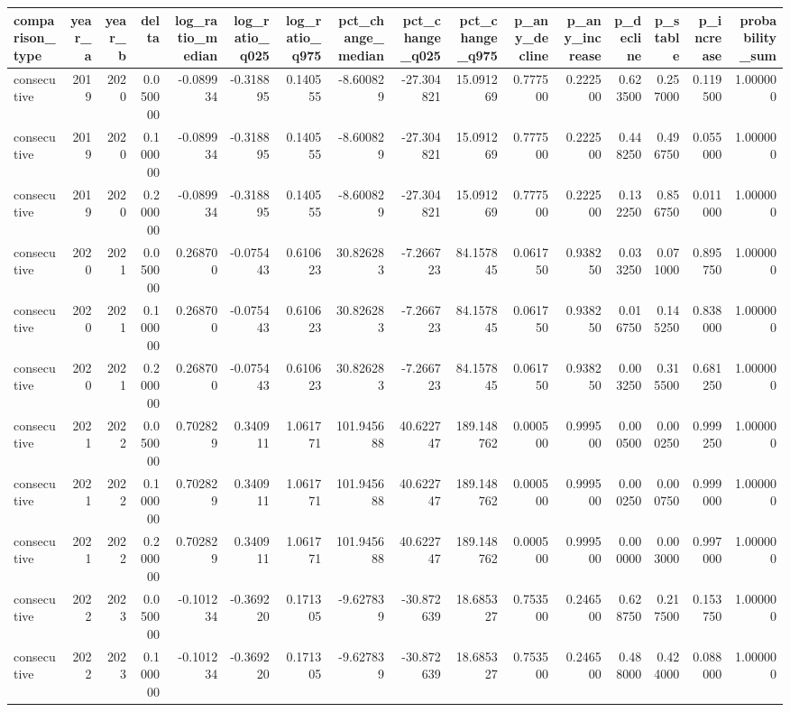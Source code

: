 \begin{tabular}{lrrrrrrrrrrrrrrr}
\toprule
comparison\_type & year\_a & year\_b & delta & log\_ratio\_median & log\_ratio\_q025 & log\_ratio\_q975 & pct\_change\_median & pct\_change\_q025 & pct\_change\_q975 & p\_any\_decline & p\_any\_increase & p\_decline & p\_stable & p\_increase & probability\_sum \\
\midrule
consecutive & 2019 & 2020 & 0.050000 & -0.089934 & -0.318895 & 0.140555 & -8.600829 & -27.304821 & 15.091269 & 0.777500 & 0.222500 & 0.623500 & 0.257000 & 0.119500 & 1.000000 \\
consecutive & 2019 & 2020 & 0.100000 & -0.089934 & -0.318895 & 0.140555 & -8.600829 & -27.304821 & 15.091269 & 0.777500 & 0.222500 & 0.448250 & 0.496750 & 0.055000 & 1.000000 \\
consecutive & 2019 & 2020 & 0.200000 & -0.089934 & -0.318895 & 0.140555 & -8.600829 & -27.304821 & 15.091269 & 0.777500 & 0.222500 & 0.132250 & 0.856750 & 0.011000 & 1.000000 \\
consecutive & 2020 & 2021 & 0.050000 & 0.268700 & -0.075443 & 0.610623 & 30.826283 & -7.266723 & 84.157845 & 0.061750 & 0.938250 & 0.033250 & 0.071000 & 0.895750 & 1.000000 \\
consecutive & 2020 & 2021 & 0.100000 & 0.268700 & -0.075443 & 0.610623 & 30.826283 & -7.266723 & 84.157845 & 0.061750 & 0.938250 & 0.016750 & 0.145250 & 0.838000 & 1.000000 \\
consecutive & 2020 & 2021 & 0.200000 & 0.268700 & -0.075443 & 0.610623 & 30.826283 & -7.266723 & 84.157845 & 0.061750 & 0.938250 & 0.003250 & 0.315500 & 0.681250 & 1.000000 \\
consecutive & 2021 & 2022 & 0.050000 & 0.702829 & 0.340911 & 1.061771 & 101.945688 & 40.622747 & 189.148762 & 0.000500 & 0.999500 & 0.000500 & 0.000250 & 0.999250 & 1.000000 \\
consecutive & 2021 & 2022 & 0.100000 & 0.702829 & 0.340911 & 1.061771 & 101.945688 & 40.622747 & 189.148762 & 0.000500 & 0.999500 & 0.000250 & 0.000750 & 0.999000 & 1.000000 \\
consecutive & 2021 & 2022 & 0.200000 & 0.702829 & 0.340911 & 1.061771 & 101.945688 & 40.622747 & 189.148762 & 0.000500 & 0.999500 & 0.000000 & 0.003000 & 0.997000 & 1.000000 \\
consecutive & 2022 & 2023 & 0.050000 & -0.101234 & -0.369220 & 0.171305 & -9.627839 & -30.872639 & 18.685327 & 0.753500 & 0.246500 & 0.628750 & 0.217500 & 0.153750 & 1.000000 \\
consecutive & 2022 & 2023 & 0.100000 & -0.101234 & -0.369220 & 0.171305 & -9.627839 & -30.872639 & 18.685327 & 0.753500 & 0.246500 & 0.488000 & 0.424000 & 0.088000 & 1.000000 \\

\end{tabular}
